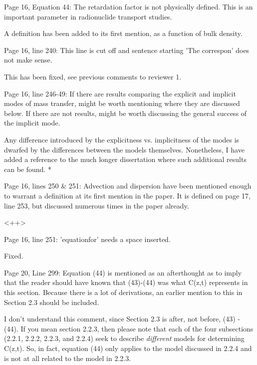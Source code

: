 \documentclass[answers,12pt]{exam}
\begin{document}
\begin{questions}
\question Page  16,  Equation  44:  The  retardation  factor  is  not physically defined. This is an important parameter in 
radionuclide transport studies.  
\begin{solution}
A definition has been added to its first mention, as a function of bulk 
        density.
\end{solution} 
 
\question Page 16, line 240: This line is cut off and sentence starting 'The correspon' does not make sense. 
\begin{solution}
This has been fixed, see previous comments to reviewer 1.
\end{solution} 
 
\question Page  16,  line  246-49:  If  there  are  results  comparing  the  explicit  and  implicit  modes  of  mass  transfer,  might  be  worth  mentioning  where  they  are  discussed  below.  If  there  are  not  results,  might  be  worth 
discussing the general success of the implicit mode. 
\begin{solution}
Any difference introduced by the explicitness vs. implicitness of the modes is 
        dwarfed by the differences between the models themselves. Nonetheless, 
        I have added a reference to the much longer dissertation where such 
        additional results can be found. 
        {\color{red} *} 
\end{solution} 
 
\question Page  16,  lines  250 \& 251: Advection and dispersion have been mentioned enough to warrant a definition 
at  its  first  mention  in  the  paper.  It  is  defined  on  page  17,  line  253,  but  discussed numerous times in the 
paper already.  
\begin{solution}
<++>
\end{solution} 
 
\question Page 16, line 251: 'equationfor' needs a space inserted.  
\begin{solution}
Fixed.
\end{solution} 
 
\question Page  20,  Line  299:  Equation (44) is mentioned as an afterthought as to imply that the reader should have 
known  that  (43)-(44)  was  what  C(z,t)  represents  in  this  section.  Because  there  is  a  lot  of  derivations,  an 
earlier mention to this in Section 2.3 should be included.  
\begin{solution}
        I don't understand this comment, since Section 2.3 is after, not 
        before, (43) - (44). If you mean section 2.2.3, then please note that 
        each of the four subsections (2.2.1, 2.2.2, 2.2.3, and 2.2.4) seek to 
        describe \emph{different} models for determining C(z,t). So, in fact, 
        equation (44) only applies to the model discussed in 2.2.4 and is not 
        at all related to the model in 2.2.3.
\end{solution} 
 

\end{questions}
\end{document}
